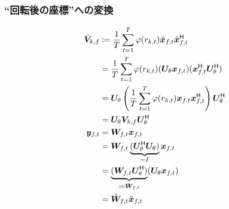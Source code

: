 \documentclass[twocolumn,9pt,dvipdfmx]{article}
\begin{document}
\subsubsection*{``回転後の座標''への変換}
\begin{align}
  \rot{\cov} _{\src,\freq} &\coloneqq \frac{1}{\Tframe} \sum _{\tframe = 1} ^{\Tframe} \weight (\var _{\src,\tframe}) \rotObs _{\ft} \rotObs _{\ft} ^{\hermite} \\
                           &= \frac{1}{\Tframe} \sum _{\tframe = 1} ^{\Tframe} \weight (\var _{\src,\tframe}) (\rotMat _{\rotDeg} \Obs _{\ft}) (\Obs _{\ft} ^{\hermite} \rotMat _{\rotDeg} ^{\hermite}) \\
                           &= \rotMat _{\rotDeg} \left(\frac{1}{\Tframe} \sum _{\tframe = 1} ^{\Tframe} \weight (\var _{\src,\tframe}) \Obs _{\ft} \Obs _{\ft} ^{\hermite}\right) \rotMat _{\rotDeg} ^{\hermite} \\
                           &= \rotMat _{\rotDeg} \cov _{\src,\freq} \rotMat _{\rotDeg} ^{\hermite}
  \\
  \Est _{\ft} &= \Demix _{\ft} \Obs _{\ft} \\
              &= \Demix _{\ft} \underbrace{(\rotMat _{\rotDeg} ^{\hermite} \rotMat _{\rotDeg})}_{=I} \Obs _{\ft} \\
              &= \underbrace{(\Demix _{\ft} \rotMat _{\rotDeg} ^{\hermite})}_{\coloneqq \rotDemix _{\ft}} (\rotMat _{\rotDeg} \Obs _{\ft}) \\
              &= \rotDemix _{\ft} \rotObs _{\ft}
\end{align}
\end{document}
